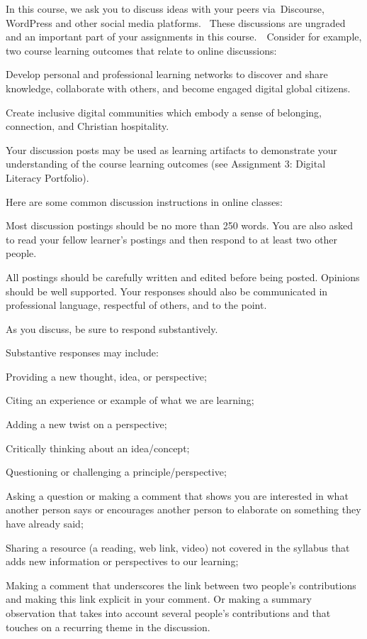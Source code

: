 \documentclass[
]{book}
\theoremstyle{definition}
\theoremstyle{definition}
\theoremstyle{definition}
\theoremstyle{definition}
\theoremstyle{remark}
\begin{document}
In this course, we ask you to discuss ideas with your peers via~{Discourse, WordPress and other social media platforms.~ These discussions are ungraded and an important part of your assignments in this course.~}~Consider for example, two course learning outcomes that relate to online discussions:

Develop personal and professional learning networks to discover and share knowledge, collaborate with others, and become engaged digital global citizens.

Create inclusive digital communities which embody a sense of belonging, connection, and Christian hospitality.

{{Your discussion posts may be used as learning artifacts to demonstrate your understanding of the course learning outcomes (see Assignment 3: Digital Literacy Portfolio).}}

{Here are some common discussion instructions in online classes:}

Most discussion postings should be no more than 250 words. You are also asked to read your fellow learner's postings and then respond to at least two other people.

All postings should be carefully written and edited before being posted. Opinions should be well supported. Your responses should also be communicated in professional language, respectful of others, and to the point.~

{As you discuss, be sure to respond substantively.}

Substantive responses may include:

Providing a new thought, idea, or perspective;

Citing an experience or example of what we are learning;

Adding a new twist on a perspective;

Critically thinking about an idea/concept;

Questioning or challenging a principle/perspective;

Asking a question or making a comment that shows you are interested in what another person says or encourages another person to elaborate on something they have already said;

Sharing a resource (a reading, web link, video) not covered in the syllabus that adds new information or perspectives to our learning;

Making a comment that underscores the link between two people's contributions and making this link explicit in your comment. Or making a summary observation that takes into account several people's contributions and that touches on a recurring theme in the discussion.
\end{document}
